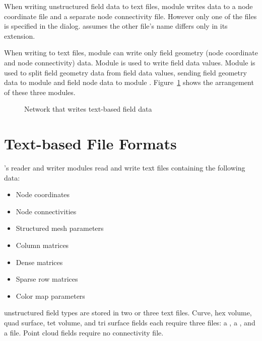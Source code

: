 When writing unstructured field data to text files, module 
writes data to a node coordinate file and a separate node connectivity
file.  However only one of the files is specified in the dialog.
 assumes the other file's name differs only in its
extension.

When writing to text files, module  can write only
field geometry (node coordinate and node connectivity) data.  Module
 is used to write field data values.  Module
 is used to split field geometry data from
field data values, sending field geometry data to module
 and field node data to module
.  Figure~\ref{fig:WriteFieldNet} shows the
arrangement of these three modules.

\begin{figure}[htb]
  \centering
  \begin{makeimage} \end{makeimage}
  \WriteFieldNet
  \caption{\label{fig:WriteFieldNet} Network that writes text-based field data}
\end{figure}


\section{Text-based File Formats}
\label{sec:text_based_formats}

\sr{}'s reader and writer modules read and write text files containing the
following data:

\begin{itemize}
\item Node coordinates
\item Node connectivities
\item Structured mesh parameters
\item Column matrices
\item Dense matrices
\item Sparse row matrices
\item Color map parameters
\end{itemize}

\sr{} unstructured field  types are stored in two or three text files.
Curve, hex volume, quad surface, tet volume, and tri surface fields
each require three files: a , a
, and a  file.  Point cloud fields require no
connectivity file.  

